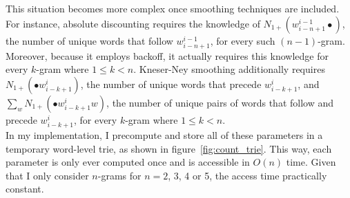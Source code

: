 \documentclass[a4paper, 12pt]{report}
\begin{document}
This situation becomes more complex once smoothing techniques are included. For instance, absolute discounting requires the knowledge of $N_{1+}(w_{i - n + 1}^{i - 1}\bullet)$, the number of unique words that follow $w_{i - n + 1}^{i - 1}$, for every such $(n - 1)$-gram. Moreover, because it employs backoff, it actually requires this knowledge for every $k$-gram where $1 \leq k < n$. Kneser-Ney smoothing additionally requires $N_{1+}(\bullet w_{i - k + 1}^i)$, the number of unique words that precede $w_{i - k + 1}^i$, and $\sum_w N_{1+}(\bullet w_{i - k + 1}^iw)$, the number of unique pairs of words that follow and precede $w_{i - k + 1}^i$, for every $k$-gram where $1 \leq k < n$. \\

In my implementation, I precompute and store all of these parameters in a temporary word-level trie, as shown in figure~\ref{fig:count_trie}. This way, each parameter is only ever computed once and is accessible in $O(n)$ time. Given that I only consider $n$-grams for $n=2$, 3, 4 or 5, the access time practically constant.
\end{document}
